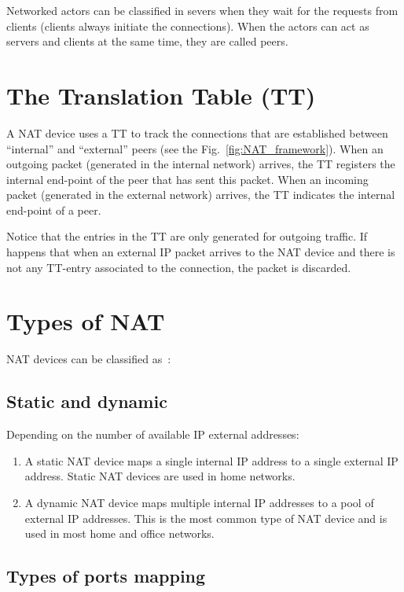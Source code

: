Networked actors can be classified in severs when they wait for the
requests from clients (clients always initiate the connections). When
the actors can act as servers and clients at the same time, they are
called peers.

\section{The Translation Table (TT)}

A NAT device uses a TT to track the connections that are established
between ``internal'' and ``external'' peers (see the
Fig.~\ref{fig:NAT_framework}). When an outgoing packet (generated in
the internal network) arrives, the TT registers the internal end-point
of the peer that has sent this packet. When an incoming packet
(generated in the external network) arrives, the TT indicates the
internal end-point of a peer.

Notice that the entries in the TT are only generated for outgoing
traffic. If happens that when an external IP packet arrives to the NAT
device and there is not any TT-entry associated to the connection, the
packet is discarded.

\section{Types of NAT}

NAT devices can be classified as~\cite{jennings2007network}:

\subsection{Static and dynamic}

Depending on the number of available IP external addresses:

\begin{enumerate}
\item A static NAT device maps a single internal IP address to a
  single external IP address. Static NAT devices are used in home
  networks.
\item A dynamic NAT device maps multiple internal IP addresses to a
  pool of external IP addresses. This is the most common type of NAT
  device and is used in most home and office networks.
\end{enumerate}

\subsection{Types of ports mapping}


